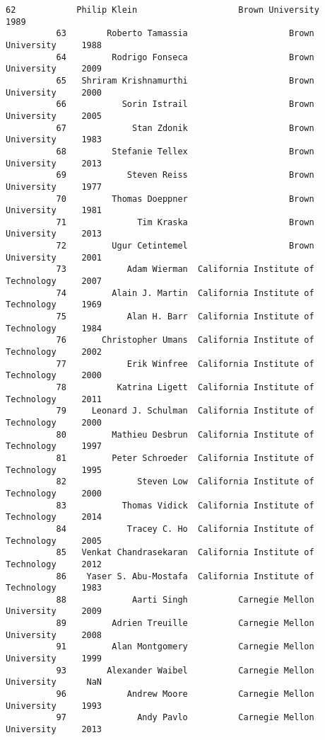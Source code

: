 \documentclass[11pt]{article}
\begin{document}
\begin{Verbatim}[commandchars=\\\{\}]
          62            Philip Klein                    Brown University     1989   
          63        Roberto Tamassia                    Brown University     1988   
          64         Rodrigo Fonseca                    Brown University     2009   
          65   Shriram Krishnamurthi                    Brown University     2000   
          66           Sorin Istrail                    Brown University     2005   
          67             Stan Zdonik                    Brown University     1983   
          68         Stefanie Tellex                    Brown University     2013   
          69            Steven Reiss                    Brown University     1977   
          70         Thomas Doeppner                    Brown University     1981   
          71              Tim Kraska                    Brown University     2013   
          72         Ugur Cetintemel                    Brown University     2001   
          73            Adam Wierman  California Institute of Technology     2007   
          74         Alain J. Martin  California Institute of Technology     1969   
          75            Alan H. Barr  California Institute of Technology     1984   
          76       Christopher Umans  California Institute of Technology     2002   
          77            Erik Winfree  California Institute of Technology     2000   
          78          Katrina Ligett  California Institute of Technology     2011   
          79     Leonard J. Schulman  California Institute of Technology     2000   
          80         Mathieu Desbrun  California Institute of Technology     1997   
          81         Peter Schroeder  California Institute of Technology     1995   
          82              Steven Low  California Institute of Technology     2000   
          83           Thomas Vidick  California Institute of Technology     2014   
          84            Tracey C. Ho  California Institute of Technology     2005   
          85   Venkat Chandrasekaran  California Institute of Technology     2012   
          86    Yaser S. Abu-Mostafa  California Institute of Technology     1983   
          88             Aarti Singh          Carnegie Mellon University     2009   
          89         Adrien Treuille          Carnegie Mellon University     2008   
          91         Alan Montgomery          Carnegie Mellon University     1999   
          93        Alexander Waibel          Carnegie Mellon University      NaN   
          96            Andrew Moore          Carnegie Mellon University     1993   
          97              Andy Pavlo          Carnegie Mellon University     2013   

\end{Verbatim}
\end{document}
